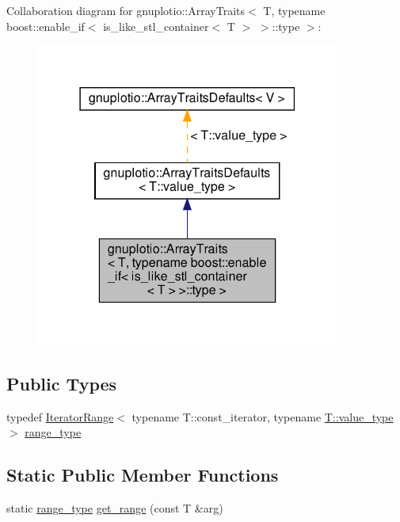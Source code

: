 Collaboration diagram for gnuplotio\+:\+:Array\+Traits$<$ T, typename boost\+:\+:enable\+\_\+if$<$ is\+\_\+like\+\_\+stl\+\_\+container$<$ T $>$ $>$\+:\+:type $>$\+:
\nopagebreak
\begin{figure}[H]
\begin{center}
\leavevmode
\includegraphics[width=283pt]{classgnuplotio_1_1_array_traits_3_01_t_00_01typename_01boost_1_1enable__if_3_01is__like__stl__coea0859b06c932ef4cd47658c6683d98b}
\end{center}
\end{figure}
\subsection*{Public Types}
\begin{DoxyCompactItemize}
\item 
typedef \hyperlink{classgnuplotio_1_1_iterator_range}{Iterator\+Range}$<$ typename T\+::const\+\_\+iterator, typename \hyperlink{classgnuplotio_1_1_array_traits_a3bcae12a7bf42af90f4946acc66f27e0}{T\+::value\+\_\+type} $>$ \hyperlink{classgnuplotio_1_1_array_traits_3_01_t_00_01typename_01boost_1_1enable__if_3_01is__like__stl__co9e1736bbd08cd58c6993ab613a998887_ab702072abbe018bbc90b9967ca8c4b42}{range\+\_\+type}
\end{DoxyCompactItemize}
\subsection*{Static Public Member Functions}
\begin{DoxyCompactItemize}
\item 
static \hyperlink{classgnuplotio_1_1_array_traits_3_01_t_00_01typename_01boost_1_1enable__if_3_01is__like__stl__co9e1736bbd08cd58c6993ab613a998887_ab702072abbe018bbc90b9967ca8c4b42}{range\+\_\+type} \hyperlink{classgnuplotio_1_1_array_traits_3_01_t_00_01typename_01boost_1_1enable__if_3_01is__like__stl__co9e1736bbd08cd58c6993ab613a998887_a89d4150ab3c479cde972071a10acd27b}{get\+\_\+range} (const T \&arg)
\end{DoxyCompactItemize}
